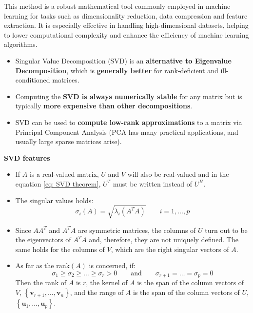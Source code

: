 \noindent
This method is a robust mathematical tool commonly employed in machine learning for tasks such as dimensionality reduction, data compression and feature extraction. It is especially effective in handling high-dimensional datasets, helping to lower computational complexity and enhance the efficiency of machine learning algorithms.
\begin{itemize}
    \item[\ding{51}] Singular Value Decomposition (SVD) is an \textbf{alternative to Eigenvalue Decomposition}, which is \textbf{generally better} for rank-deficient and ill-conditioned matrices.
    \item[\ding{51}] Computing the \textbf{SVD is always numerically stable} for any matrix but is typically \textbf{more expensive than other decompositions}.
    \item[\ding{51}] SVD can be used to \textbf{compute low-rank approximations} to a matrix via Principal Component Analysis (PCA has many practical applications, and usually large sparse matrices arise).
\end{itemize}

\newpage
\begin{flushleft}
    \textcolor{Green3}{ \textbf{SVD features}}
\end{flushleft}
\begin{itemize}
    \item If $A$ is a real-valued matrix, $U$ and $V$ will also be real-valued and in the equation \ref{eq: SVD theorem}, $U^{T}$ must be written instead of $U^{H}$.

    \item The singular values holds:
    \begin{equation}
        \sigma_{i}\left(A\right) = \sqrt{\lambda_{i}\left(A^{T} A\right)} \hspace{2em} i = 1, \dots, p
    \end{equation}

    \item Since $AA^{T}$ and $A^{T}A$ are symmetric matrices, the columns of $U$ turn out to be the eigenvectors of $A^{T}A$ and, therefore, they are not uniquely defined. The same holds for the columns of $V$, which are the right singular vectors of $A$.

    \item As far as the $\mathrm{rank}\left(A\right)$ is concerned, if:
    \begin{equation*}
        \sigma_{1} \ge \sigma_{2} \ge \dots \ge \sigma_{r} > 0 \hspace{2em} \text{and} \hspace{2em} \sigma_{r+1} = \dots = \sigma_{p} = 0
    \end{equation*}
    Then the rank of $A$ is $r$, the kernel of $A$ is the span of the column vectors of $V$, $\left\{\mathbf{v}_{r+1}, \dots, \mathbf{v}_{n}\right\}$, and the range of $A$ is the span of the column vectors of $U$, $\left\{\mathbf{u}_{1}, \dots, \mathbf{u}_{p}\right\}$.
\end{itemize}

